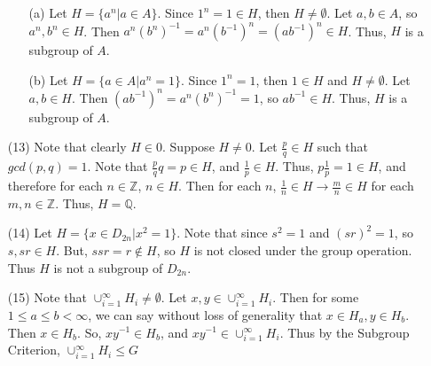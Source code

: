 \documentclass[12pt]{article}
\begin{document}
\begin{itemize}
\begin{itemize}
\item[(a)]
Let $H = \{ a^n | a \in A \}$. Since $1^n = 1 \in H$, then $H \neq \emptyset$. Let $a, b \in A$, so $a^n, b^n \in H$. Then $a^n(b^n)^{-1} = a^n(b^{-1})^n = (ab^{-1})^n \in H$. Thus, $H$ is a subgroup of $A$.
\item[(b)]
Let $H = \{ a \in A | a^n = 1 \}$. Since $1^n = 1$, then $1 \in H$ and $H \neq \emptyset$. Let $a, b \in H$. Then $(ab^{-1})^n = a^n(b^{n})^{-1} = 1$, so $ab^{-1} \in H$.  Thus, $H$ is a subgroup of $A$.
\end{itemize}
\item[(13)] 
Note that clearly $H \in 0$. Suppose $H \neq 0$. Let $\frac{p}{q} \in H$ such that $gcd(p, q) = 1$. Note that $\frac{p}{q}q = p \in H$, and $\frac{1}{p} \in H$. Thus, $p\frac{1}{p} = 1 \in H$, and therefore for each $n \in \mathbb{Z}$, $n \in H$. Then for each $n$, $\frac{1}{n} \in H \rightarrow \frac{m}{n} \in H$ for each $m, n \in \mathbb{Z}$. Thus, $H = \mathbb{Q}$.
\item[(14)]
Let $H = \{ x \in D_{2n} | x^2 = 1 \}$. Note that since $s^2 = 1$ and $(sr)^2 = 1$, so $s, sr \in H$. But, $ssr = r \not \in H$, so $H$ is not closed under the group operation. Thus $H$ is not a subgroup of $D_{2n}$.
\item[(15)]
Note that $\cup_{i=1}^\infty H_i \neq \emptyset$. Let $x, y \in \cup_{i=1}^\infty H_i$. Then for some $1 \leq a \leq b < \infty$, we can say without loss of generality that $x \in H_a, y \in H_b$. Then $x \in H_b$. So, $xy^{-1} \in H_b$, and $xy^{-1} \in \cup_{i=1}^\infty H_i$. Thus by the Subgroup Criterion, $\cup_{i=1}^\infty H_i \leq G$
\end{itemize}
\end{document}
